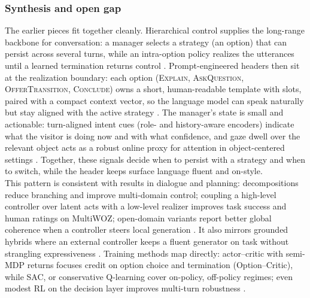 \documentclass[12pt]{article}
\begin{document}
\subsubsection{Synthesis and open gap}
\label{sec:synthesis-gap}

The earlier pieces fit together cleanly. Hierarchical control supplies the long-range backbone for conversation: a manager selects a strategy (an option) that can persist across several turns, while an intra-option policy realizes the utterances until a learned termination returns control \citep{sutton1999between,bacon2017option}. Prompt-engineered headers then sit at the realization boundary: each option (\textsc{Explain}, \textsc{AskQuestion}, \textsc{OfferTransition}, \textsc{Conclude}) owns a short, human-readable template with slots, paired with a compact context vector, so the language model can speak naturally but stay aligned with the active strategy \citep{robino2025conversation,wang2024planning}. The manager’s state is small and actionable: turn-aligned intent cues (role- and history-aware encoders) indicate what the visitor is doing now and with what confidence, and gaze dwell over the relevant object acts as a robust online proxy for attention in object-centered settings \citep{zhang2021dialoguebert,zhang2021intentbert,holmqvist2011eyetracking,orquin2018,Bozkir2021,Dubovi2022}. Together, these signals decide when to persist with a strategy and when to switch, while the header keeps surface language fluent and on-style.\\

This pattern is consistent with results in dialogue and planning: decompositions reduce branching and improve multi-domain control; coupling a high-level controller over latent acts with a low-level realizer improves task success and human ratings on MultiWOZ; open-domain variants report better global coherence when a controller steers local generation \citep{dietterich2000maxq,casanueva2018feudal,wang2021hdno,saleh2020hierarchical}. It also mirrors grounded hybrids where an external controller keeps a fluent generator on task without strangling expressiveness \citep{ahn2022saycan}. Training methods map directly: actor--critic with semi-MDP returns focuses credit on option choice and termination (Option--Critic), while SAC, or conservative Q-learning cover on-policy, off-policy regimes; even modest RL on the decision layer improves multi-turn robustness \citep{bacon2017option,schulman2017ppo-openreview,haarnoja2018sac,kumar2020conservative,su2017sample,weisz2018sample}.\\
\end{document}
